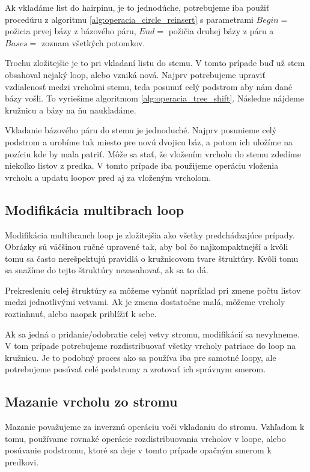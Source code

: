 Ak vkladáme list do hairpinu, je to jednodúche, potrebujeme iba použiť procedúru z algoritmu \ref{alg:operacia_circle_reinsert}
s parametrami $Begin = $ požicia prvej bázy z bázového páru, $End = $ požičia druhej bázy z páru
a $Bases = $ zoznam všetkých potomkov.

Trochu zložitejšie je to pri vkladaní listu do stemu. V tomto prípade buď už stem obsahoval nejaký loop, alebo vzniká nová.
Najprv potrebujeme upraviť vzdialenosť medzi vrcholmi stemu, teda posunuť celý podstrom aby nám dané bázy vošli.
To vyriešime algoritmom \ref{alg:operacia_tree_shift}. Následne nájdeme kružnicu a bázy na ňu naukladáme.

Vkladanie bázového páru do stemu je jednoduché. Najprv posunieme celý podstrom a urobíme tak miesto pre novú dvojicu
báz, a potom ich uložíme na pozíciu kde by mala patriť. Môže sa stať, že vložením vrcholu do stemu zdedíme niekoľko
listov z predka. V tomto prípade iba použijeme operáciu vloženia vrcholu a updatu loopov pred aj za vloženým vrcholom.

\subsection{Modifikácia multibrach loop}

Modifikácia multibranch loop je zložitejšia ako všetky predchádzajúce prípady. Obrázky sú väčšinou ručné upravené tak,
aby bol čo najkompaktnejší a kvôli tomu sa často nerešpektujú pravidlá o kružnicovom tvare štruktúry.
Kvôli tomu sa snažíme do tejto štruktúry nezasahovať, ak sa to dá.

Prekresleniu celej štruktúry sa môžeme vyhnúť napríklad pri zmene počtu listov medzi jednotlivými vetvami.
Ak je zmena dostatočne malá, môžeme vrcholy roztiahnuť, alebo naopak priblížiť k sebe.

Ak sa jedná o pridanie/odobratie celej vetvy stromu, modifikácií sa nevyhneme. V tom prípade potrebujeme
rozdistribuovať všetky vrcholy patriace do loop na kružnicu. Je to podobný proces ako sa používa iba pre samotné loopy,
ale potrebujeme posúvať celé podstromy a zrotovať ich správnym smerom.

\subsection{Mazanie vrcholu zo stromu}

Mazanie považujeme za inverznú operáciu voči vkladaniu do stromu. Vzhľadom k tomu, používame rovnaké operácie
rozdistribuovania vrcholov v loope, alebo posúvanie podstromu, ktoré sa deje v tomto prípade opačným smerom
k predkovi.

